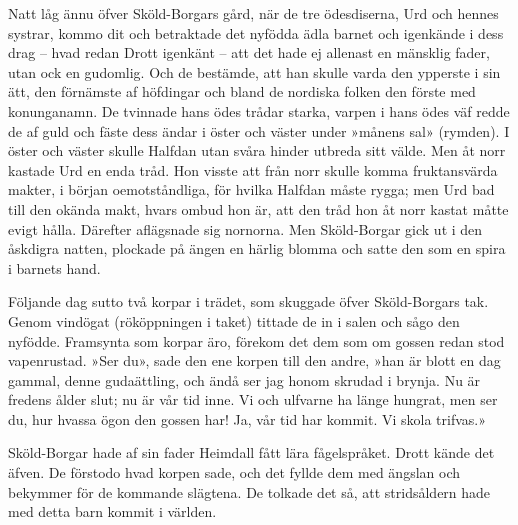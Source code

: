 Natt låg ännu öfver Sköld-Borgars gård, när de tre ödesdiserna, Urd och
hennes systrar, kommo dit och betraktade det nyfödda ädla barnet och
igenkände i dess drag -- hvad redan Drott igenkänt -- att det hade ej
allenast en mänsklig fader, utan ock en gudomlig. Och de bestämde, att
han skulle varda den ypperste i sin ätt, den förnämste af höfdingar och
bland de nordiska folken den förste med konunganamn. De tvinnade hans
ödes trådar starka, varpen i hans ödes väf redde de af guld och fäste
dess ändar i öster och väster under »månens sal» (rymden). I öster och
väster skulle Halfdan utan svåra hinder utbreda sitt välde. Men åt norr
kastade Urd en enda tråd. Hon visste att från norr skulle komma
fruktansvärda makter, i början oemotståndliga, för hvilka Halfdan måste
rygga; men Urd bad till den okända makt, hvars ombud hon är, att den
tråd hon åt norr kastat måtte evigt hålla. Därefter aflägsnade sig
nornorna. Men Sköld-Borgar gick ut i den åskdigra natten, plockade på
ängen en härlig blomma och satte den som en spira i barnets hand.

Följande dag sutto två korpar i trädet, som skuggade öfver Sköld-Borgars
tak. Genom vindögat (rököppningen i taket) tittade de in i salen och
sågo den nyfödde. Framsynta som korpar äro, förekom det dem som om
gossen redan stod vapenrustad. »Ser du», sade den ene korpen till den
andre, »han är blott en dag gammal, denne gudaättling, och ändå ser jag
honom skrudad i brynja. Nu är fredens ålder slut;
nu är vår tid inne. Vi och ulfvarne ha länge hungrat, men ser du, hur
hvassa ögon den gossen har! Ja, vår tid har kommit. Vi skola trifvas.»

Sköld-Borgar hade af sin fader Heimdall fått lära fågelspråket. Drott
kände det äfven. De förstodo hvad korpen sade, och det fyllde dem med
ängslan och bekymmer för de kommande slägtena. De tolkade det så, att
stridsåldern hade med detta barn kommit i världen.

